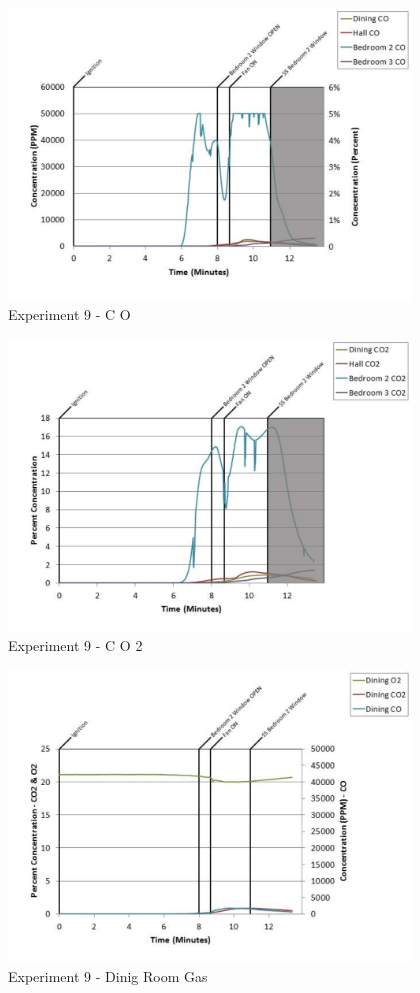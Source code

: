 \documentclass{article}
\begin{document}
\begin{appendices}
	\clearpage

	\begin{figure}[h!]
		\centering
		\includegraphics[height=3.05in]{0_Images/Results_Charts/Exp_9_Charts/CO.pdf}
		\caption{Experiment 9 - C O}
	\end{figure}
 

	\begin{figure}[h!]
		\centering
		\includegraphics[height=3.05in]{0_Images/Results_Charts/Exp_9_Charts/CO2.pdf}
		\caption{Experiment 9 - C O 2}
	\end{figure}
 
	\clearpage

	\begin{figure}[h!]
		\centering
		\includegraphics[height=3.05in]{0_Images/Results_Charts/Exp_9_Charts/DinigRoomGas.pdf}
		\caption{Experiment 9 - Dinig Room Gas}
	\end{figure}
 


\end{appendices}
\end{document}
